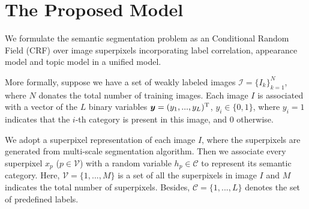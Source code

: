 
\section{The Proposed Model}
We formulate the semantic segmentation problem as an Conditional Random Field (CRF) over image superpixels incorporating label correlation, appearance model and topic model in a unified model.

More formally, suppose we have a set of weakly labeled images $\mathcal{I}=\{I_k\}_{k=1}^N$, where $N$ donates the total number of training images. Each image $I$ is associated with a vector of the $L$ binary variables $\boldsymbol{y} = (y_1,...,y_L)^{\rm T}$, \ie $y_i \in \{0,1\}$, where $y_i=1$ indicates that the $i$-th category is present in this image, and $0$ otherwise.

We adopt a superpixel representation of each image $I$, where the superpixels are generated from multi-scale segmentation algorithm. Then we associate every superpixel $x_p$ ($p \in \mathcal{V}$) with a random variable $h_p \in \mathcal{C}$ to represent its semantic category. Here, $\mathcal{V} = \{1,...,M\}$ is a set of all the superpixels in image $I$ and $M$ indicates the total number of superpixels. Besides, $\mathcal{C} = \{1,...,L\}$ denotes the set of predefined labels.

